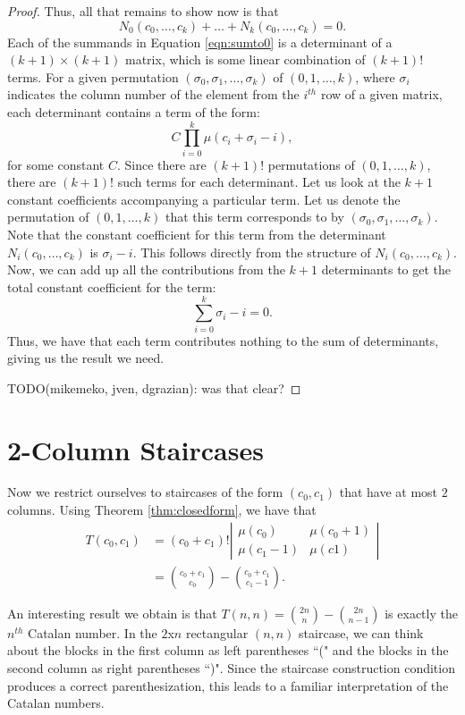 \documentclass[12pt]{amsart}
\newcommand{\N}{N}
\newcommand{\newsection}[2]{
\section{#1 \label{#2}}
}
\begin{document}
\begin{proof}
Thus, all that remains to show now is that
\begin{equation}
\N_0(c_0,\dots,c_k) + \dots + \N_k(c_0,\dots,c_k) = 0.
\label{eqn:sumto0}
\end{equation}
Each of the summands in Equation \ref{eqn:sumto0} is a determinant of a $(k+1)\times(k+1)$ matrix, which is some linear combination of $(k+1)!$ terms. For a given permutation $(\sigma_0, \sigma_1, \dots, \sigma_k)$ of $(0,1,\dots,k)$, where $\sigma_i$ indicates the column number of the element from the $i^{th}$ row of a given matrix, each determinant contains a term of the form:
$$
C \prod_{i=0}^{k}{\mu(c_i+\sigma_i-i)},
$$
for some constant $C$. Since there are $(k+1)!$ permutations of $(0,1,\dots,k)$, there are $(k+1)!$ such terms for each determinant. Let us look at the $k+1$ constant coefficients accompanying a particular term. Let us denote the permutation of $(0,1,\dots,k)$ that this term corresponds to by $(\sigma_0, \sigma_1, \dots, \sigma_k)$. Note that the constant coefficient for this term from the determinant $\N_i(c_0,\dots,c_k)$ is $\sigma_i - i$. This follows directly from the structure of $\N_i(c_0,\dots,c_k)$. Now, we can add up all the contributions from the $k+1$ determinants to get the total constant coefficient for the term:
$$
\sum_{i=0}^{k}{\sigma_i-i} = 0.
$$
Thus, we have that each term contributes nothing to the sum of determinants, giving us the result we need.

TODO(mikemeko, jven, dgrazian): was that clear?
\end{proof}

\newsection{2-Column Staircases}{sec:twocolumn}
Now we restrict ourselves to staircases of the form $(c_0,c_1)$ that have at most $2$ columns. Using Theorem \ref{thm:closedform}, we have that
\begin{align*}
T(c_0,c_1) & = (c_0 + c_1)! \left|
\begin{matrix}
\mu(c_0) & \mu(c_0 + 1) \\
\mu(c_1 - 1) & \mu(c1)
\end{matrix}\right| \\
& =\binom{c_0 + c_1}{c_0} - \binom{c_0 + c_1}{c_1 - 1}.
\end{align*}

An interesting result we obtain is that $T(n,n) = \binom{2n}{n} - \binom{2n}{n-1}$ is exactly the $n^{th}$ Catalan number. In the $2$x$n$ rectangular $(n,n)$ staircase, we can think about the blocks in the first column as left parentheses ``(" and the blocks in the second column as right parentheses ``)". Since the staircase construction condition produces a correct parenthesization, this leads to a familiar interpretation of the Catalan numbers. 
\end{document}
